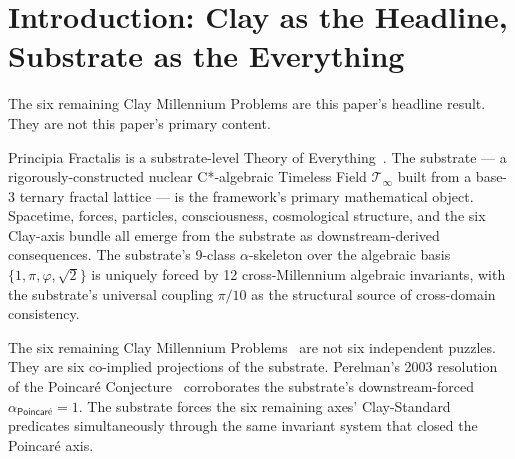 \documentclass[11pt,a4paper]{amsart}
\theoremstyle{plain}
\theoremstyle{definition}
\begin{document}
\tableofcontents

\section{Introduction: Clay as the Headline, Substrate as the Everything}\label{sec:intro}

The six remaining Clay Millennium Problems are this paper's headline result. They are not this paper's primary content.

Principia Fractalis is a substrate-level Theory of Everything~\cite{cohen2026book,cohen2025unifiedClay,cohen2026corroborating}. The substrate --- a rigorously-constructed nuclear C*-algebraic Timeless Field $\mathcal{T}_\infty$ built from a base-3 ternary fractal lattice --- is the framework's primary mathematical object. Spacetime, forces, particles, consciousness, cosmological structure, and the six Clay-axis bundle all emerge from the substrate as downstream-derived consequences. The substrate's 9-class $\alpha$-skeleton over the algebraic basis $\{1, \pi, \varphi, \sqrt{2}\}$ is uniquely forced by 12 cross-Millennium algebraic invariants, with the substrate's universal coupling $\pi/10$ as the structural source of cross-domain consistency.

The six remaining Clay Millennium Problems~\cite{clay2000} are not six independent puzzles. They are six co-implied projections of the substrate. Perelman's 2003 resolution of the Poincar\'e Conjecture~\cite{perelman2003} corroborates the substrate's downstream-forced $\alpha_{\textsf{Poincar\'e}} = 1$. The substrate forces the six remaining axes' Clay-Standard predicates simultaneously through the same invariant system that closed the Poincar\'e axis.
\end{document}
